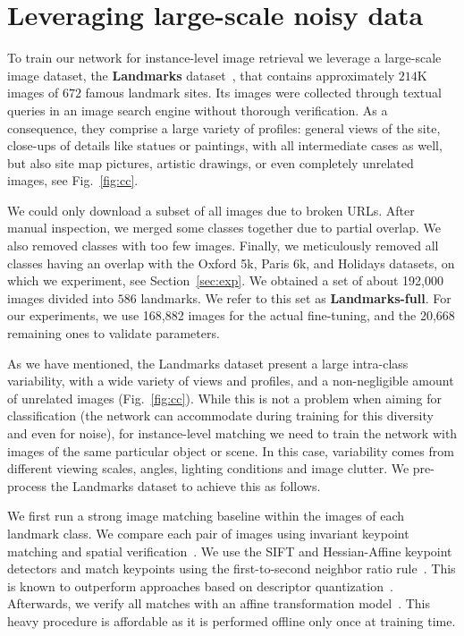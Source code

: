 \documentclass[runningheads]{llncs}
\newcommand{\myparagraph}[1]{\noindent {\bf #1.}}
\begin{document}
\section{Leveraging large-scale noisy data}
\label{sec:cleaning}
To train our network for instance-level image retrieval we leverage a large-scale image dataset, the
\textbf{Landmarks} dataset~\cite{Babenko2014}, that contains approximately $214$K images 
of $672$ famous landmark sites. 
Its images were collected through textual queries in an image search engine without thorough verification.
As a consequence, they comprise a large variety of profiles:
general views of the site, close-ups of details like statues or paintings, 
with all intermediate cases as well, but also site map pictures, artistic drawings, or even completely unrelated images, see Fig.~\ref{fig:cc}.

We could only download a subset of all images due to broken URLs. After manual inspection, we merged some classes
together due to partial overlap.  We also removed classes with too few images. Finally, we meticulously removed all
classes having an overlap with the Oxford 5k, Paris 6k, and Holidays datasets, on which we experiment, see
Section~\ref{sec:exp}.
We obtained a set of about 192,000 images divided into $586$ landmarks.
We refer to this set as \textbf{Landmarks-full}.
For our experiments, we use 168,882 images for the actual fine-tuning, and the 20,668 remaining ones to validate parameters.

\myparagraph{Cleaning the Landmarks dataset} 
As we have mentioned, the Landmarks dataset present a large intra-class variability, with a wide variety of views and profiles, and
a non-negligible amount of unrelated images 
(Fig.~\ref{fig:cc}). While this is not a problem when aiming for classification (the network can accommodate during
training for this diversity and even for noise), for instance-level matching we need to train the network with images of the same
particular object or scene. In this case, variability comes from different viewing scales, angles, lighting conditions
and image clutter.
We pre-process the Landmarks dataset to achieve this as follows.

We first run a strong image
matching baseline within the images of each landmark class.  We compare each pair of images using invariant keypoint
matching and spatial verification~\cite{Lowe2004}. We use the SIFT and Hessian-Affine keypoint detectors
\cite{Lowe2004,Mikolajczyk2004} and match keypoints using the first-to-second neighbor ratio rule~\cite{Lowe2004}. This is known
to outperform approaches based on descriptor quantization~\cite{Philbin2010}. Afterwards, we verify all matches with an
affine transformation model~\cite{Philbin2007}. This heavy procedure is affordable as it is performed offline only once at training time.
\end{document}
